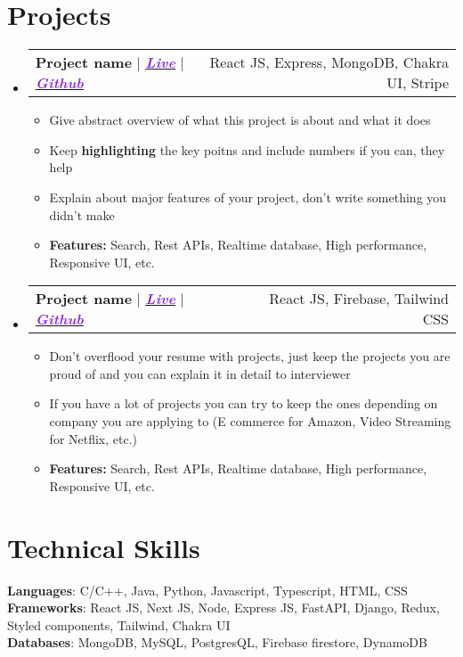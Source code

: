 \documentclass[a4paper,11pt]{article}
\makeatletter
\newcommand{\resumeItem}[1]{
  \item\small{
    {#1 \vspace{-2pt}}
  }
}
\newcommand{\resumeProjectHeading}[2]{
    \item
    \begin{tabular*}{0.97\textwidth}{l@{\extracolsep{\fill}}r}
      \small#1 & #2 \\
    \end{tabular*}\vspace{-7pt}
}
\newcommand{\resumeSubHeadingListStart}{\begin{itemize}[leftmargin=0.15in, label={}]}
\newcommand{\resumeSubHeadingListEnd}{\end{itemize}}
\newcommand{\resumeItemListStart}{\begin{itemize}}
\newcommand{\resumeItemListEnd}{\end{itemize}\vspace{-5pt}}
\makeatother
\begin{document}
\section{\Large{Projects}}
    \resumeSubHeadingListStart
      \resumeProjectHeading
          {\textbf{\large{Project name}} $|$ \emph{\href{https://google.com/}{\textcolor{BlueViolet}{\textbf{Live}}}} $|$ \emph{\href{https://github.com/}{\textcolor{BlueViolet}{\textbf{Github}}}}}{React JS, Express, MongoDB, Chakra UI, Stripe}
          \resumeItemListStart
            \resumeItem{Give abstract overview of what this project is about and what it does}
            \resumeItem{Keep \textbf{highlighting} the key poitns and include numbers if you can, they help}
            \resumeItem{Explain about major features of your project, don't write something you didn't make}
            \resumeItem{\textbf{Features:} Search, Rest APIs, Realtime database, High performance, Responsive UI, etc. }
          \resumeItemListEnd
          
    \resumeProjectHeading
          {\textbf{\large{Project name}} $|$ \emph{\href{https://google.com/}{\textcolor{BlueViolet}{\textbf{Live}}}} $|$ \emph{\href{https://github.com/}{\textcolor{BlueViolet}{\textbf{Github}}}}}{React JS, Firebase, Tailwind CSS}
          \resumeItemListStart
            \resumeItem{Don't overflood your resume with projects, just keep the projects you are proud of and you can explain it in detail to interviewer}
            \resumeItem{If you have a lot of projects you can try to keep the ones depending on company you are applying to (E commerce for Amazon, Video Streaming for Netflix, etc.)}
            \resumeItem{\textbf{Features:} Search, Rest APIs, Realtime database, High performance, Responsive UI, etc. }
          \resumeItemListEnd
          
    \resumeSubHeadingListEnd


\section{\Large{Technical Skills}}
 \begin{itemize}[leftmargin=0.15in, label={}]
    \small{\item{
     \textbf{Languages}{: C/C++, Java, Python, Javascript, Typescript, HTML, CSS} \\
     \textbf{Frameworks}{: React JS, Next JS, Node, Express JS, FastAPI, Django, Redux, Styled components, Tailwind, Chakra UI} \\
     \textbf{Databases}{: MongoDB, MySQL, PostgresQL, Firebase firestore, DynamoDB} \\
    }}
 \end{itemize}
\end{document}
